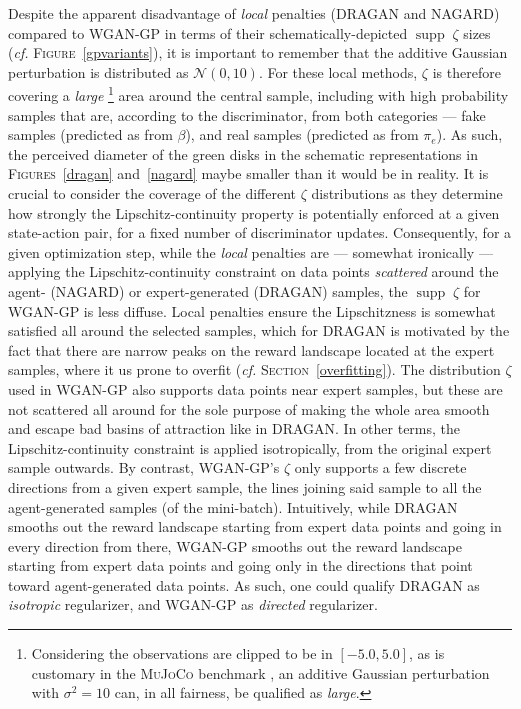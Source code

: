 Despite the apparent disadvantage of \emph{local} penalties
(DRAGAN \cite{Kodali2017-xt} and NAGARD) compared to WGAN-GP
in terms of their schematically-depicted $\operatorname{supp} \; \zeta$ sizes
(\textit{cf.} \textsc{Figure}~\ref{gpvariants}),
it is important to remember that the additive Gaussian perturbation is
distributed as $\mathcal{N}(0,10)$.
For these local methods, $\zeta$ is therefore covering a
\emph{large} \footnote{Considering the observations are clipped to be in $[-5.0, 5.0]$,
as is customary in the \textsc{MuJoCo} \cite{Todorov2012-gc} benchmark \cite{Brockman2016-un},
an additive Gaussian perturbation with $\sigma^2=10$ can,
in all fairness, be qualified as \emph{large}.}
area around the central sample, including with high probability samples that are,
according to the discriminator, from both categories
--- fake samples (predicted as from $\beta$),
and real samples (predicted as from $\pi_e$).
As such, the perceived diameter of the green disks in the schematic representations in
\textsc{Figures}~\ref{dragan} and~\ref{nagard} maybe smaller than it would be in reality.
It is crucial to consider the coverage of the different $\zeta$ distributions
as they determine how strongly the Lipschitz-continuity property is potentially
enforced at a given state-action pair, for a fixed number of discriminator updates.
Consequently, for a given optimization step,
while the \emph{local} penalties are --- somewhat ironically ---
applying the Lipschitz-continuity constraint on data points \emph{scattered} around the
agent- (NAGARD) or expert-generated (DRAGAN) samples,
the $\operatorname{supp} \; \zeta$ for WGAN-GP is less diffuse.
Local penalties ensure the Lipschitzness is somewhat satisfied all around the
selected samples, which for DRAGAN is motivated by the fact that there are narrow peaks
on the reward landscape located at the expert samples,
where it us prone to overfit (\textit{cf.} \textsc{Section}~\ref{overfitting}).
The distribution $\zeta$ used in WGAN-GP also supports data points near expert samples,
but these are not scattered all around for the sole purpose of making the whole area smooth
and escape bad basins of attraction like in DRAGAN.
In other terms, the Lipschitz-continuity constraint is applied isotropically,
from the original expert sample outwards.
By contrast, WGAN-GP's $\zeta$ only supports a few discrete directions from a given expert sample,
the lines joining said sample to all the agent-generated samples (of the mini-batch).
Intuitively, while DRAGAN smooths out the reward landscape starting from expert data points
and going in every direction from there,
WGAN-GP smooths out the reward landscape starting from expert data points
and going only in the directions that point toward agent-generated data points.
As such, one could qualify DRAGAN as \emph{isotropic} regularizer,
and WGAN-GP as \emph{directed} regularizer.

